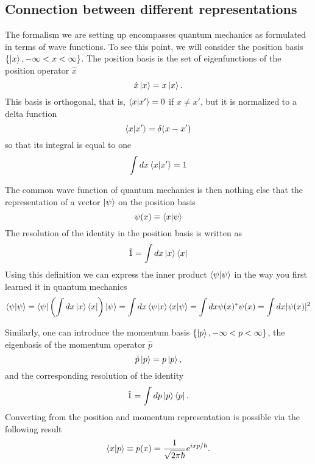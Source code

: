 \documentclass[../Main/chem532-notes.tex]{subfiles}
\begin{document}
\subsection{Connection between different representations}
The formalism we are setting up encompasses quantum mechanics as formulated in terms of wave functions.
To see this point, we will consider the position basis $\{ \ket{x}, -\infty < x < \infty \}$.
The position basis is the set of eigenfunctions of the position operator $\hat{x}$
\begin{equation}
\hat{x} \ket{x} = x \ket{x}.
\end{equation}
This basis is orthogonal, that is, $\braket{x | x'} = 0$ if $x \neq x'$, but it is normalized to a delta function
\begin{equation}
\braket{x | x'} = \delta(x - x')
\end{equation}
so that its integral is equal to one
\begin{equation}
\int dx \braket{x | x'} = 1
\end{equation}

The common wave function of quantum mechanics is then nothing else that the representation of a vector $\ket{\psi}$ on the position basis
\begin{equation}
\psi(x) \equiv \braket{x | \psi}
\end{equation}
The resolution of the identity in the position basis is written as
\begin{equation}
\hat{1} = \int dx \ket{x} \bra{x} 
\end{equation}
Using this definition we can express the inner product $\braket{\psi|\psi}$ in the way you first learned it in quantum mechanics
\begin{equation}
\braket{\psi|\psi} = \bra{\psi} \left( \int dx \ket{x} \bra{x} \right) \ket{\psi}
= \int dx  \braket{\psi|x} \braket{x|\psi} = \int dx  \psi(x)^* \psi(x) = \int dx  |\psi(x)|^2
\end{equation}

Similarly, one can introduce the momentum basis $\{ \ket{p}, -\infty < p < \infty \}$, the eigenbasis of the momentum operator $\hat{p}$
\begin{equation}
\hat{p} \ket{p} = p \ket{p},
\end{equation}
and the corresponding resolution of the identity
\begin{equation}
\hat{1} = \int dp \ket{p} \bra{p}.
\end{equation}
Converting from the position and momentum representation is possible via the following result
\begin{equation}
\braket{x | p}  \equiv p(x) = \frac{1}{\sqrt{2 \pi \hbar}}e^{ixp/\hbar}.
\end{equation}
\end{document}
